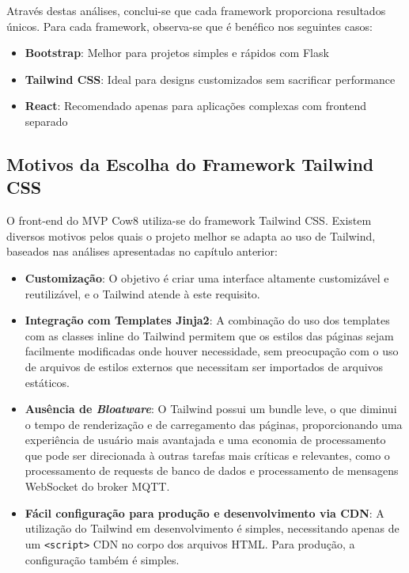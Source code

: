 \documentclass[11pt]{article}
\begin{document}
Através destas análises, conclui-se que cada framework proporciona resultados únicos. Para cada framework, observa-se que é benéfico nos seguintes casos:

\begin{itemize}
\item \textbf{Bootstrap}: Melhor para projetos simples e rápidos com Flask
\item \textbf{Tailwind CSS}: Ideal para designs customizados sem sacrificar performance
\item \textbf{React}: Recomendado apenas para aplicações complexas com frontend separado
\end{itemize}

\subsection{Motivos da Escolha do Framework Tailwind CSS}

O front-end do MVP Cow8 utiliza-se do framework Tailwind CSS. Existem diversos motivos pelos quais o projeto melhor se adapta ao uso de Tailwind, baseados nas análises apresentadas no capítulo anterior:

\begin{itemize}
\item \textbf{Customização}: O objetivo é criar uma interface altamente customizável e reutilizável, e o Tailwind atende à este requisito.
\item \textbf{Integração com Templates Jinja2}: A combinação do uso dos templates com as classes inline do Tailwind permitem que os estilos das páginas sejam facilmente modificadas onde houver necessidade, sem preocupação com o uso de arquivos de estilos externos que necessitam ser importados de arquivos estáticos.
\item \textbf{Ausência de \textit{Bloatware}}: O Tailwind possui um bundle leve, o que diminui o tempo de renderização e de carregamento das páginas, proporcionando uma experiência de usuário mais avantajada e uma economia de processamento que pode ser direcionada à outras tarefas mais críticas e relevantes, como o processamento de requests de banco de dados e processamento de mensagens WebSocket do broker MQTT.
\item \textbf{Fácil configuração para produção e desenvolvimento via CDN}: A utilização do Tailwind em desenvolvimento é simples, necessitando apenas de um \texttt{<script>} CDN no corpo dos arquivos HTML. Para produção, a configuração também é simples.
\end{itemize}
\end{document}
